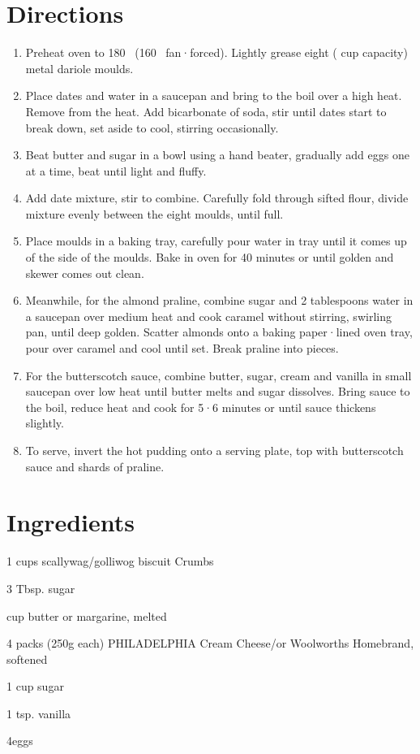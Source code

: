 \section*{Directions}
\begin{enumerate}
	\item Preheat oven to 180 \textcelsius\ (160 \textcelsius\            fan·forced). Lightly grease eight ( cup capacity) metal dariole moulds.
	\item Place dates and water in a saucepan and bring to the boil over a high heat. Remove from the heat.
		Add bicarbonate of soda, stir until dates start to break down, set aside to cool, stirring occasionally.
	\item Beat butter and sugar in a bowl using a hand beater, gradually add eggs one at a time, beat until light and fluffy.
	\item Add date mixture, stir to combine. Carefully fold through sifted flour, divide mixture evenly between the eight moulds, until  full.
	\item Place moulds in a baking tray, carefully pour water in tray until it comes up  of the side of the moulds.
		Bake in oven for 40 minutes or until golden and skewer comes out clean.
	\item Meanwhile, for the almond praline, combine sugar and 2 tablespoons water in a saucepan over medium heat and cook caramel without stirring,
		swirling pan, until deep golden. Scatter almonds onto a baking paper·lined oven tray, pour over caramel and cool until set. Break praline into pieces.
	\item For the butterscotch sauce, combine butter, sugar, cream and vanilla in small saucepan over low heat until butter melts and sugar dissolves.
		Bring sauce to the boil, reduce heat and cook for 5·6 minutes or until sauce thickens slightly.
	\item To serve, invert the hot pudding onto a serving plate, top with butterscotch sauce and shards of praline.
\end{enumerate}


\section*{Ingredients}
\begin{ingredients-list}
	\item 1 cups scallywag/golliwog biscuit Crumbs
	\item 3 Tbsp. sugar
	\item {} cup butter or margarine, melted
	\item 4 packs (250g each) PHILADELPHIA Cream Cheese/or Woolworths Homebrand, softened
	\item 1 cup sugar
	\item 1 tsp. vanilla
	\item 4eggs
\end{ingredients-list}

